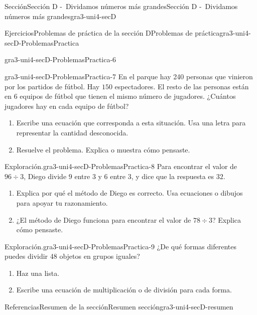 \documentclass[twoside,10pt,]{article}
\begin{document}
\begin{sectionptx}{Sección}{Sección D -~Dividamos números más grandes}{}{Sección D -~Dividamos números más grandes}{}{}{gra3-uni4-secD}
\begin{exercises-subsection}{Ejercicios}{Problemas de práctica de la sección D}{}{Problemas de práctica}{}{}{gra3-uni4-secD-ProblemasPractica}
\begin{divisionexercise}{4}{}{}{gra3-uni4-secD-ProblemasPractica-6}
\begin{enumerate}[label=(\alph*)]
\end{enumerate}
\end{divisionexercise}%
\begin{divisionexercise}{5}{}{}{gra3-uni4-secD-ProblemasPractica-7}%
En el parque hay 240 personas que vinieron por los partidos de fútbol. Hay \(150\) espectadores. El resto de las personas están en \(6\) equipos de fútbol que tienen el mismo número de jugadores. ¿Cuántos jugadores hay en cada equipo de fútbol?%
%
\begin{enumerate}[label=(\alph*)]
\item{}Escribe una ecuación que corresponda a esta situación. Usa una letra para representar la cantidad desconocida.%
\item{}Resuelve el problema. Explica o muestra cómo pensaste.%
\end{enumerate}
\end{divisionexercise}%
\begin{divisionexercise}{6}{Exploración.}{}{gra3-uni4-secD-ProblemasPractica-8}%
Para encontrar el valor de \(96 \div 3\), Diego divide \(9\) entre \(3\) y \(6\) entre \(3\), y dice que la respuesta es \(32\).%
%
\begin{enumerate}[label=(\alph*)]
\item{}Explica por qué el método de Diego es correcto. Usa ecuaciones o dibujos para apoyar tu razonamiento.%
\item{}¿El método de Diego funciona para encontrar el valor de \(78 \div 3\)?%
 Explica cómo pensaste.\end{enumerate}
\end{divisionexercise}%
\begin{divisionexercise}{7}{Exploración.}{}{gra3-uni4-secD-ProblemasPractica-9}%
¿De qué formas diferentes puedes dividir 48 objetos en grupos iguales?%
%
\begin{enumerate}[label=(\alph*)]
\item{}Haz una lista.%
\item{}Escribe una ecuación de multiplicación o de división para cada forma.%
\end{enumerate}
\end{divisionexercise}%
\end{exercises-subsection}
%
%
\typeout{************************************************}
\typeout{************************************************}
%
\begin{references-subsection}{Referencias}{Resumen de la sección}{}{Resumen sección}{}{}{gra3-uni4-secD-resumen}

\end{references-subsection}
\end{sectionptx}
\end{document}
